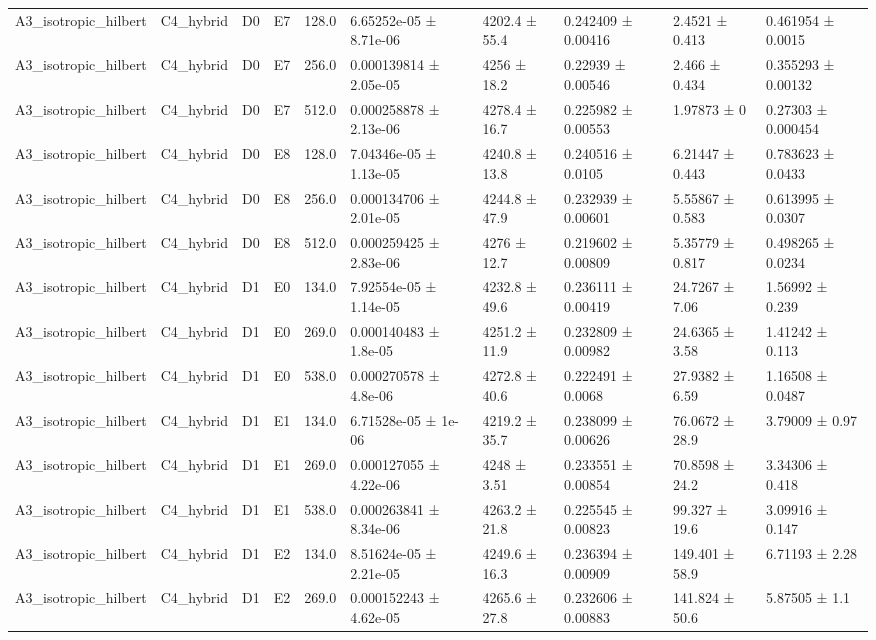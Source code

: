 \begin{table}
\begin{tabular}{llllllllll}
A3\_isotropic\_hilbert & C4\_hybrid & D0 & E7 & 128.0 & 6.65252e-05 ± 8.71e-06 & 4202.4 ± 55.4 & 0.242409 ± 0.00416 & 2.4521 ± 0.413 & 0.461954 ± 0.0015 \\
A3\_isotropic\_hilbert & C4\_hybrid & D0 & E7 & 256.0 & 0.000139814 ± 2.05e-05 & 4256 ± 18.2 & 0.22939 ± 0.00546 & 2.466 ± 0.434 & 0.355293 ± 0.00132 \\
A3\_isotropic\_hilbert & C4\_hybrid & D0 & E7 & 512.0 & 0.000258878 ± 2.13e-06 & 4278.4 ± 16.7 & 0.225982 ± 0.00553 & 1.97873 ± 0 & 0.27303 ± 0.000454 \\
A3\_isotropic\_hilbert & C4\_hybrid & D0 & E8 & 128.0 & 7.04346e-05 ± 1.13e-05 & 4240.8 ± 13.8 & 0.240516 ± 0.0105 & 6.21447 ± 0.443 & 0.783623 ± 0.0433 \\
A3\_isotropic\_hilbert & C4\_hybrid & D0 & E8 & 256.0 & 0.000134706 ± 2.01e-05 & 4244.8 ± 47.9 & 0.232939 ± 0.00601 & 5.55867 ± 0.583 & 0.613995 ± 0.0307 \\
A3\_isotropic\_hilbert & C4\_hybrid & D0 & E8 & 512.0 & 0.000259425 ± 2.83e-06 & 4276 ± 12.7 & 0.219602 ± 0.00809 & 5.35779 ± 0.817 & 0.498265 ± 0.0234 \\
A3\_isotropic\_hilbert & C4\_hybrid & D1 & E0 & 134.0 & 7.92554e-05 ± 1.14e-05 & 4232.8 ± 49.6 & 0.236111 ± 0.00419 & 24.7267 ± 7.06 & 1.56992 ± 0.239 \\
A3\_isotropic\_hilbert & C4\_hybrid & D1 & E0 & 269.0 & 0.000140483 ± 1.8e-05 & 4251.2 ± 11.9 & 0.232809 ± 0.00982 & 24.6365 ± 3.58 & 1.41242 ± 0.113 \\
A3\_isotropic\_hilbert & C4\_hybrid & D1 & E0 & 538.0 & 0.000270578 ± 4.8e-06 & 4272.8 ± 40.6 & 0.222491 ± 0.0068 & 27.9382 ± 6.59 & 1.16508 ± 0.0487 \\
A3\_isotropic\_hilbert & C4\_hybrid & D1 & E1 & 134.0 & 6.71528e-05 ± 1e-06 & 4219.2 ± 35.7 & 0.238099 ± 0.00626 & 76.0672 ± 28.9 & 3.79009 ± 0.97 \\
A3\_isotropic\_hilbert & C4\_hybrid & D1 & E1 & 269.0 & 0.000127055 ± 4.22e-06 & 4248 ± 3.51 & 0.233551 ± 0.00854 & 70.8598 ± 24.2 & 3.34306 ± 0.418 \\
A3\_isotropic\_hilbert & C4\_hybrid & D1 & E1 & 538.0 & 0.000263841 ± 8.34e-06 & 4263.2 ± 21.8 & 0.225545 ± 0.00823 & 99.327 ± 19.6 & 3.09916 ± 0.147 \\
A3\_isotropic\_hilbert & C4\_hybrid & D1 & E2 & 134.0 & 8.51624e-05 ± 2.21e-05 & 4249.6 ± 16.3 & 0.236394 ± 0.00909 & 149.401 ± 58.9 & 6.71193 ± 2.28 \\
A3\_isotropic\_hilbert & C4\_hybrid & D1 & E2 & 269.0 & 0.000152243 ± 4.62e-05 & 4265.6 ± 27.8 & 0.232606 ± 0.00883 & 141.824 ± 50.6 & 5.87505 ± 1.1 \\

\end{tabular}
\end{table}
